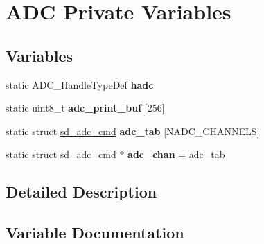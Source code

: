 \hypertarget{group___s_d___a_d_c___private___variables}{}\section{A\+DC Private Variables}
\label{group___s_d___a_d_c___private___variables}
\subsection*{Variables}
\begin{DoxyCompactItemize}
\item 
\mbox{\label{group___s_d___a_d_c___private___variables_ga62fcafba91cf315db7e0e0c8f22c656f}} 
static A\+D\+C\+\_\+\+Handle\+Type\+Def {\bfseries hadc}
\item 
\mbox{\label{group___s_d___a_d_c___private___variables_ga0cee903f77a0f1fc00c111ac3136e312}} 
static uint8\+\_\+t {\bfseries adc\+\_\+print\+\_\+buf} \mbox{[}256\mbox{]}
\item 
static struct \mbox{\hyperlink{structsd__adc__cmd}{sd\+\_\+adc\+\_\+cmd}} {\bfseries adc\+\_\+tab} \mbox{[}N\+A\+D\+C\+\_\+\+C\+H\+A\+N\+N\+E\+LS\mbox{]}
\item 
\mbox{\label{group___s_d___a_d_c___private___variables_ga863232ca96e75348c07ce653256162fb}} 
static struct \mbox{\hyperlink{structsd__adc__cmd}{sd\+\_\+adc\+\_\+cmd}} $\ast$ {\bfseries adc\+\_\+chan} = adc\+\_\+tab
\end{DoxyCompactItemize}


\subsection{Detailed Description}


\subsection{Variable Documentation}
\mbox{\label{group___s_d___a_d_c___private___variables_gae2b5fb1a2baa77e00a91493d3b8c2e6d}} 
